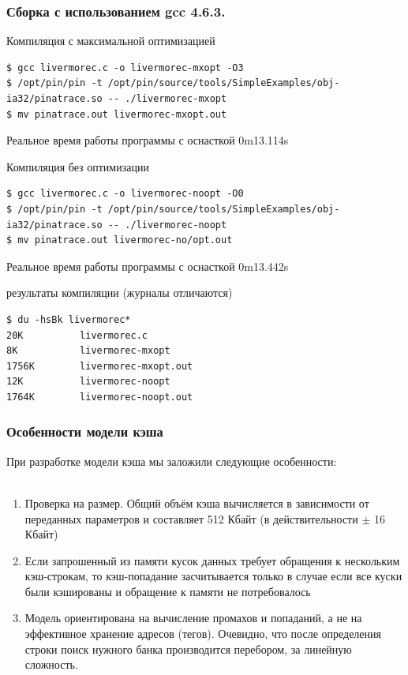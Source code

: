\documentclass{beamer}
\begin{document}
\begin{frame}[fragile] %
\frametitle{Сборка с использованием gcc 4.6.3.}

\begin{block}{Компиляция с максимальной оптимизацией}
\begin{verbatim}
$ gcc livermorec.c -o livermorec-mxopt -O3
$ /opt/pin/pin -t /opt/pin/source/tools/SimpleExamples/obj-ia32/pinatrace.so -- ./livermorec-mxopt
$ mv pinatrace.out livermorec-mxopt.out
\end{verbatim}
\end{block}
Реальное время работы программы с оснасткой 0m13.114s

\begin{block}{Компиляция без оптимизации}
\begin{verbatim}
$ gcc livermorec.c -o livermorec-noopt -O0
$ /opt/pin/pin -t /opt/pin/source/tools/SimpleExamples/obj-ia32/pinatrace.so -- ./livermorec-noopt
$ mv pinatrace.out livermorec-no/opt.out
\end{verbatim}
\end{block}
Реальное время работы программы с оснасткой 0m13.442s

\begin{block}{результаты компиляции (журналы отличаются)}
\begin{verbatim}
$ du -hsBk livermorec*
20K          livermorec.c
8K           livermorec-mxopt
1756K        livermorec-mxopt.out
12K          livermorec-noopt
1764K        livermorec-noopt.out
\end{verbatim}
\end{block}

\end{frame}


\begin{frame}
\frametitle{Особенности модели кэша}

При разработке модели кэша мы заложили следующие особенности:\\~\\

\begin{enumerate}
\item Проверка на размер. Общий объём кэша вычисляется в зависимости от переданных параметров и составляет 512 Кбайт (в действительности $\pm$ 16 Кбайт)
\item Если запрошенный из памяти кусок данных требует обращения к нескольким кэш-строкам, то кэш-попадание засчитывается только в случае если все куски были кэшированы и обращение к памяти не потребовалось
\item Модель ориентирована на вычисление промахов и попаданий, а не на эффективное хранение адресов (тегов). Очевидно, что после определения строки поиск нужного банка производится перебором, за линейную сложность.
\end{enumerate}

\end{frame}
\end{document}
